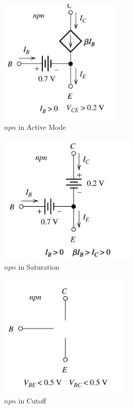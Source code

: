 \documentclass[12pt]{article}
\begin{document}
  \begin{multicols}{3}

    \begin{figure}[H]
      \centering
      \includegraphics[width=.3\textwidth]{Figures/BJTActive}
      \vspace{-10pt}
      \caption{$npn$ in Active Mode}
      \label{fig:1}
    \end{figure}

    \begin{figure}[H]
      \centering
      \includegraphics[width=.3\textwidth]{Figures/BJTSat}
      \caption{$npn$ in Saturation}
      \label{fig:2}
    \end{figure}

    \begin{figure}[H]
      \centering
      \includegraphics[width=.3\textwidth]{Figures/BJTCut}
      \caption{$npn$ in Cutoff}
      \label{fig:3}
    \end{figure}

  \end{multicols}
\end{document}
